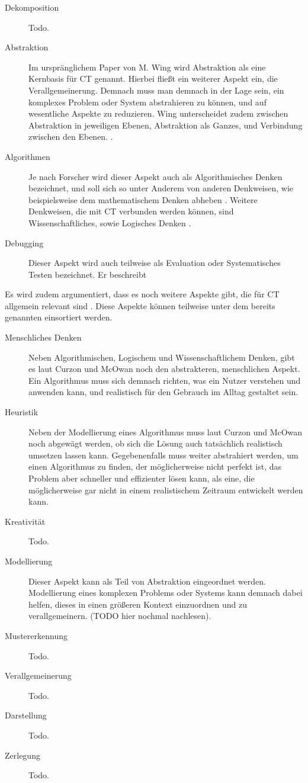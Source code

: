 \begin{description}
    \item[Dekomposition] Todo.
    \item[Abstraktion] Im urspränglichem Paper von M. Wing wird Abstraktion als eine Kernbasis für CT genannt. Hierbei fließt ein weiterer Aspekt ein, die Verallgemeinerung.
    Demnach muss man demnach in der Lage sein, ein komplexes Problem oder System abstrahieren zu können, und auf wesentliche Aspekte zu reduzieren. Wing unterscheidet zudem zwischen Abstraktion in jeweiligen Ebenen, Abstraktion als Ganzes, und Verbindung zwischen den Ebenen. \cite{wing2008}.
    \item[Algorithmen] Je nach Forscher wird dieser Aspekt auch als Algorithmisches Denken bezeichnet, und soll sich so unter Anderem von anderen Denkweisen, wie beispielsweise dem mathematischem Denken abheben \cite{schute}. Weitere Denkweisen, die mit CT verbunden werden können, sind Wissenschaftliches, sowie Logisches Denken \cite{curzon}.
    \item[Debugging] Dieser Aspekt wird auch teilweise als Evaluation \cite{curzon} oder Systematisches Testen \cite{wing2006} bezeichnet. Er beschreibt %
\end{description}

Es wird zudem argumentiert, dass es noch weitere Aspekte gibt, die für CT allgemein relevant sind \cite{curzon}. Diese Aspekte können teilweise unter dem bereits genannten einsortiert werden.

\begin{description}
    \item[Menschliches Denken] Neben Algorithmischen, Logischem und Wissenschaftlichem Denken, gibt es laut Curzon und McOwan \cite{curzon} noch den abstrakteren, menschlichen Aspekt. Ein Algorithmus muss sich demnach richten, was ein Nutzer verstehen und anwenden kann, und realistisch für den Gebrauch im Alltag gestaltet sein.
    \item[Heuristik] Neben der Modellierung eines Algorithmus muss laut Curzon und McOwan noch abgewägt werden, ob sich die Lösung auch tatsächlich realistisch umsetzen lassen kann. Gegebenenfalls muss weiter abstrahiert werden, um einen Algorithmus zu finden, der möglicherweise nicht perfekt ist, das Problem aber schneller und effizienter lösen kann, als eine, die möglicherweise gar nicht in einem realistischem Zeitraum entwickelt werden kann.
    \item[Kreativität] Todo.
    \item[Modellierung] Dieser Aspekt kann als Teil von Abstraktion eingeordnet werden. Modellierung eines komplexen Problems oder Systems kann demnach dabei helfen, dieses in einen größeren Kontext einzuordnen und zu verallgemeinern. (TODO hier nochmal nachlesen).
    \item[Mustererkennung] Todo.
    \item[Verallgemeinerung] Todo.
    \item[Darstellung] Todo.
    \item[Zerlegung] Todo.
\end{description} 

